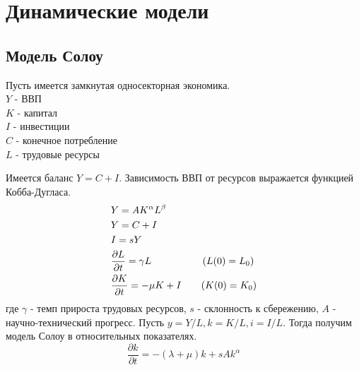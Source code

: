 %
%
%
%
%
% 

\section{Динамические модели}
\subsection{Модель Солоу}
\noindent Пусть имеется замкнутая односекторная экономика.\\
$Y$ - ВВП\\
$K$ - капитал\\
$I$ - инвестиции\\
$C$ - конечное потребление\\
$L$ - трудовые ресурсы

Имеется баланс $Y=C+I$. Зависимость ВВП от ресурсов выражается функцией Кобба-Дугласа.
\begin{align}
  &Y=AK^{\alpha}L^{\beta}\notag\\
  &Y=C+I\notag\\
  &I=sY\\
  &\dfrac{\partial L}{\partial t}=\gamma L \qquad \qquad\quad\,(L(0)=L_0)\notag\\
  &\dfrac{\partial K}{\partial t}=-\mu K+I \qquad(K(0)=K_0)\notag
\end{align}
где $ \gamma$ - темп прироста трудовых ресурсов, $s$ - склонность к сбережению, $A$ - научно-технический прогресс.
Пусть $y=Y/L,k=K/L,i=I/L$. Тогда получим модель Солоу в относительных показателях.
\begin{equation}
  \frac{\partial k}{\partial t}=-(\lambda+\mu)k+sAk^{\alpha}
\end{equation}

